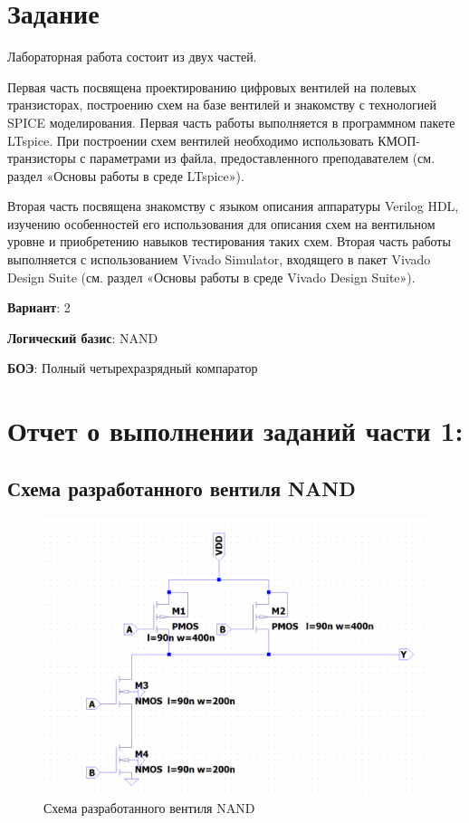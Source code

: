 \documentclass[12pt,onecolumn]{article}
\begin{document}
\section{Задание}
Лабораторная работа состоит из двух частей.

Первая часть посвящена проектированию цифровых вентилей на полевых транзисторах, построению схем на базе вентилей и знакомству с технологией SPICE моделирования. Первая часть работы выполняется в программном пакете LTspice. При построении схем вентилей необходимо использовать КМОП-транзисторы с параметрами из файла, предоставленного преподавателем (см. раздел «Основы работы в среде LTspice»).

Вторая часть посвящена знакомству с языком описания аппаратуры Verilog HDL, изучению особенностей его использования для описания схем на вентильном уровне и приобретению навыков тестирования таких схем. Вторая часть работы выполняется с использованием Vivado Simulator, входящего в пакет Vivado Design Suite (см. раздел «Основы работы в среде Vivado Design Suite»).

\textbf{Вариант}: 2

\textbf{Логический базис}: NAND

\textbf{БОЭ}: Полный четырехразрядный компаратор

\section{Отчет о выполнении заданий части 1:}
\subsection{Схема разработанного вентиля NAND}
\begin{figure}[H]
    \centering
    \includegraphics[scale=0.5]{image/ventil.png}
    \caption{Схема разработанного вентиля NAND}
\end{figure}
\end{document}
